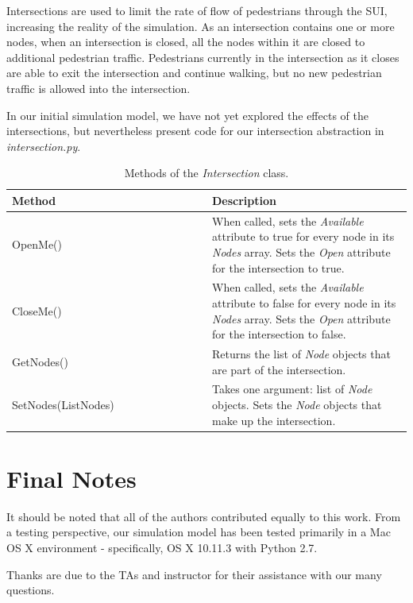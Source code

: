 \documentclass[12pt]{article}
\begin{document}
Intersections are used to limit the rate of flow of pedestrians through the SUI,
increasing the reality of the simulation. As an intersection contains one or
more nodes, when an intersection is closed, all the nodes within it are
closed to additional pedestrian traffic. Pedestrians currently in the
intersection as it closes are able to exit the intersection and continue
walking, but no new pedestrian traffic is allowed into the intersection.

In our initial simulation model, we have not yet explored the effects of
the intersections, but nevertheless present code for our intersection
abstraction in \textit{intersection.py}.

\def\arraystretch{1.5}
\begin{table}
  \centering
    \begin{tabular}{p{0.5\linewidth}p{0.5\linewidth}}
     \hline
     Method & Description \\
     \hline
     OpenMe()  & When called, sets the \textit{Available} attribute to
                 true for every node in its \textit{Nodes} array. Sets the
                 \textit{Open} attribute for the intersection to true. \\
     CloseMe() & When called, sets the \textit{Available} attribute to
                 false for every node in its \textit{Nodes} array. Sets the
                 \textit{Open} attribute for the intersection to false. \\
     GetNodes() & Returns the list of \textit{Node} objects that are part of the
                  intersection. \\
     SetNodes(ListNodes) & Takes one argument: list of \textit{Node} objects.
                           Sets the \textit{Node} objects that make up the
                           intersection. \\
     \hline
    \end{tabular}
    \caption{Methods of the \textit{Intersection} class.}
    \label{table:intersection_methods}
\end{table}

\section{Final Notes}
It should be noted that all of the authors contributed equally to this work.
From a testing perspective, our simulation model has been tested primarily in
a Mac OS X environment - specifically, OS X 10.11.3 with Python 2.7.

Thanks are due to the TAs and instructor for their assistance with our many
questions.

\clearpage
{}

\end{document}
